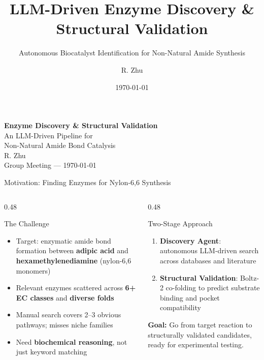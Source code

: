 \documentclass[aspectratio=169, 11pt]{beamer}
\title{LLM-Driven Enzyme Discovery \& Structural Validation}
\subtitle{Autonomous Biocatalyst Identification for Non-Natural Amide Synthesis}
\author{R. Zhu}
\date{\today}
\begin{document}
{
\begin{frame}[plain]
\vfill
\begin{center}
{\Huge\bfseries\color{white} Enzyme Discovery \& Structural Validation}\\[10pt]
{\Large\color{lightblue} An LLM-Driven Pipeline for\\Non-Natural Amide Bond Catalysis}\\[24pt]
{\large\color{white} R. Zhu}\\[6pt]
{\normalsize\color{lightblue!70} Group Meeting --- \today}
\end{center}
\vfill
\end{frame}
}

\begin{frame}{Motivation: Finding Enzymes for Nylon-6,6 Synthesis}
\begin{columns}[T]
\begin{column}{0.48\textwidth}
\begin{alertblock}{The Challenge}
\begin{itemize}
\item Target: enzymatic amide bond formation between \textbf{adipic acid} and \textbf{hexamethylenediamine} (nylon-6,6 monomers)
\item Relevant enzymes scattered across \textbf{6+ EC classes} and \textbf{diverse folds}
\item Manual search covers 2--3 obvious pathways; misses niche families
\item Need \textbf{biochemical reasoning}, not just keyword matching
\end{itemize}
\end{alertblock}
\end{column}
\begin{column}{0.48\textwidth}
\begin{exampleblock}{Two-Stage Approach}
\begin{enumerate}
\item \textbf{Discovery Agent}: autonomous LLM-driven search across databases and literature
\item \textbf{Structural Validation}: Boltz-2 co-folding to predict substrate binding and pocket compatibility
\end{enumerate}
\end{exampleblock}

\vspace{4pt}
\colorbox{lightblue!50}{\parbox{0.92\textwidth}{\centering
\small\textbf{Goal:} Go from target reaction to structurally validated candidates, ready for experimental testing.
}}
\end{column}
\end{columns}
\end{frame}
\end{document}
